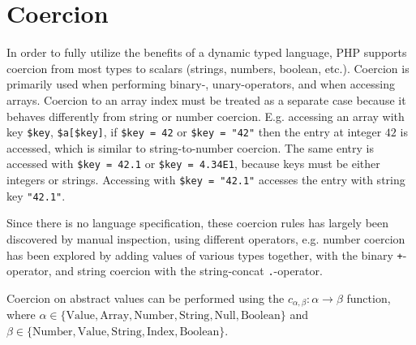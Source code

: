 \section{Coercion}
\label{sec:coercion}

In order to fully utilize the benefits of a dynamic typed language, PHP supports coercion from most types to scalars (strings, numbers, boolean, etc.). Coercion is primarily used when performing binary-, unary-operators, and when accessing arrays. Coercion to an array index must be treated as a separate case because it behaves differently from string or number coercion. E.g. accessing an array with key \texttt{\$key}, \texttt{\$a[\$key]}, if \texttt{\$key = 42} or \texttt{\$key = "42"} then the entry at integer $42$ is accessed, which is similar to string-to-number coercion. The same entry is accessed with \texttt{\$key = 42.1} or \texttt{\$key = 4.34E1}, because keys must be either integers or strings. Accessing with \texttt{\$key = "42.1"} accesses the entry with string key \texttt{"42.1"}. 

Since there is no language specification, these coercion rules has largely been discovered by manual inspection, using different operators, e.g. number coercion has been explored by adding values of various types together, with the binary \texttt{+}-operator, and string coercion with the string-concat \texttt{.}-operator.

Coercion on abstract values can be performed using the $c_{\alpha, \beta} : \alpha \rightarrow \beta$ function, where $\alpha \in \{ \text{Value}, \text{Array}, \text{Number}, \text{String}, \text{Null}, \text{Boolean}\}$ and $\beta \in \{\text{Number}, \text{Value}, \text{String}, \text{Index}, \text{Boolean}\}$. 

